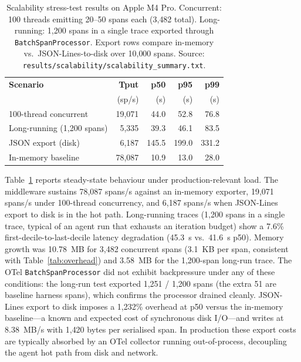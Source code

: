 \documentclass[sigconf,review,anonymous,9pt]{acmart}
\begin{document}
\begin{table}[t]
\centering
\small
\caption{Scalability stress-test results on Apple M4 Pro.
Concurrent: 100 threads emitting 20--50 spans each (3{,}482 total).
Long-running: 1{,}200 spans in a single trace exported through
\texttt{BatchSpanProcessor}. Export rows compare in-memory vs.\
JSON-Lines-to-disk over 10{,}000 spans. Source:
\texttt{results/scalability/scalability\_summary.txt}.}
\label{tab:scalability}
\begin{tabular}{@{}lrrrr@{}}
\toprule
\textbf{Scenario} & \textbf{Tput} & \textbf{p50} & \textbf{p95} & \textbf{p99} \\
                  & (sp/s)        & (\textmu s)  & (\textmu s)  & (\textmu s) \\
\midrule
100-thread concurrent          & 19{,}071 & 44.0  & 52.8  & 76.8  \\
Long-running (1{,}200 spans)   &  5{,}335 & 39.3  & 46.1  & 83.5  \\
JSON export (disk)             &  6{,}187 & 145.5 & 199.0 & 331.2 \\
In-memory baseline             & 78{,}087 & 10.9  & 13.0  & 28.0  \\
\bottomrule
\end{tabular}
\end{table}

Table~\ref{tab:scalability} reports steady-state behaviour under
production-relevant load. The middleware sustains 78{,}087 spans/s
against an in-memory exporter, 19{,}071 spans/s under 100-thread
concurrency, and 6{,}187 spans/s when JSON-Lines export to disk is
in the hot path. Long-running traces (1{,}200 spans in a single
trace, typical of an agent run that exhausts an iteration budget)
show a 7.6\% first-decile-to-last-decile latency degradation
(45.3~\textmu s vs.\ 41.6~\textmu s p50). Memory growth was 10.78~MB
for 3{,}482 concurrent spans (3.1~KB per span, consistent with
Table~\ref{tab:overhead}) and 3.58~MB for the 1{,}200-span long-run
trace. The OTel \texttt{BatchSpanProcessor} did not exhibit
backpressure under any of these conditions: the long-run test
exported 1{,}251 / 1{,}200 spans (the extra 51 are baseline harness
spans), which confirms the processor drained cleanly. JSON-Lines
export to disk imposes a 1{,}232\% overhead at p50 versus the
in-memory baseline---a known and expected cost of synchronous disk
I/O---and writes at 8.38~MB/s with 1{,}420 bytes per serialised span.
In production these export costs are typically absorbed by an OTel
collector running out-of-process, decoupling the agent hot path from
disk and network.
\end{document}
